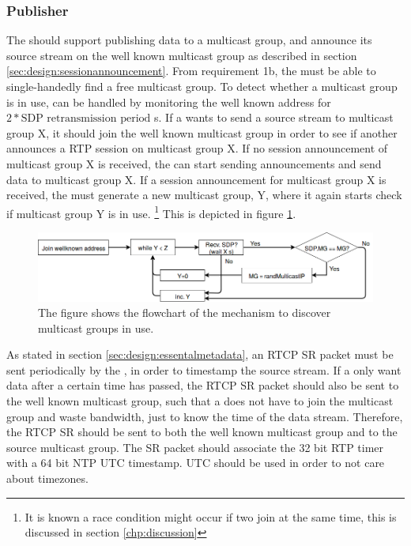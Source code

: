 \subsubsection{Publisher} \label{sec:design:publisher}
The \pub{} should support publishing data to a multicast group, and announce its source stream on the well known multicast group as described in section \ref{sec:design:sessionannouncement}.
From requirement 1b, the \pub{} must be able to single-handedly find a free multicast group. To detect whether a multicast group is in use, can be handled by monitoring the well known address for $2*\text{SDP retransmission period}$ s. If a  wants to send a source stream to multicast group X, it should join the well known multicast group in order to see if another  announces a RTP session on multicast group X. If no session announcement of multicast group X is received, the  can start sending announcements and send data to multicast group X. If a session announcement for multicast group X is received, the  must generate a new multicast group, Y, where it again starts check if multicast group Y is in use. \footnote{It is known a race condition might occur if two \pubs{} join at the same time, this is discussed in section \ref{chp:discussion}} This is depicted in figure \ref{fig:design:pubsub:inuse}.

\begin{figure}[H]
	\centering
	\includegraphics[width=\textwidth]{figures/flowchart-publisher-mg}
	\caption{The figure shows the flowchart of the mechanism to discover multicast groups in use.} \label{fig:design:pubsub:inuse}
\end{figure}

As stated in section \ref{sec:design:essentalmetadata}, an RTCP SR packet must be sent periodically by the \pub{}, in order to timestamp the source stream. If a \sub{} only want data after a certain time has passed, the RTCP SR packet should also be sent to the well known multicast group, such that a \sub{} does not have to join the multicast group and waste bandwidth, just to know the time of the data stream. Therefore, the RTCP SR should be sent to both the well known multicast group and to the source multicast group.
The SR packet should associate the 32 bit RTP timer with a 64 bit NTP \ac{UTC} timestamp. \ac{UTC} should be used in order to not care about timezones.


